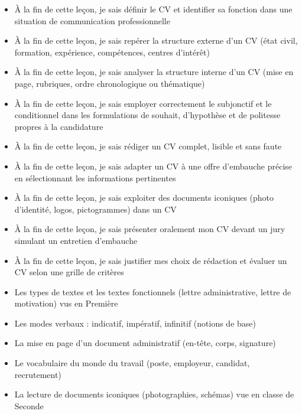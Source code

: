 \documentclass[11pt]{article}
\begin{document}
\begin{objectifs}
\begin{itemize}
\item À la fin de cette leçon, je sais définir le CV et identifier sa fonction dans une situation de communication professionnelle
\item À la fin de cette leçon, je sais repérer la structure externe d'un CV (état civil, formation, expérience, compétences, centres d'intérêt)
\item À la fin de cette leçon, je sais analyser la structure interne d'un CV (mise en page, rubriques, ordre chronologique ou thématique)
\item À la fin de cette leçon, je sais employer correctement le subjonctif et le conditionnel dans les formulations de souhait, d'hypothèse et de politesse propres à la candidature
\item À la fin de cette leçon, je sais rédiger un CV complet, lisible et sans faute
\item À la fin de cette leçon, je sais adapter un CV à une offre d'embauche précise en sélectionnant les informations pertinentes
\item À la fin de cette leçon, je sais exploiter des documents iconiques (photo d'identité, logos, pictogrammes) dans un CV
\item À la fin de cette leçon, je sais présenter oralement mon CV devant un jury simulant un entretien d'embauche
\item À la fin de cette leçon, je sais justifier mes choix de rédaction et évaluer un CV selon une grille de critères
\end{itemize}
\end{objectifs}

\begin{prerequis}
\begin{itemize}
\item Les types de textes et les textes fonctionnels (lettre administrative, lettre de motivation) vus en Première
\item Les modes verbaux : indicatif, impératif, infinitif (notions de base)
\item La mise en page d'un document administratif (en-tête, corps, signature)
\item Le vocabulaire du monde du travail (poste, employeur, candidat, recrutement)
\item La lecture de documents iconiques (photographies, schémas) vue en classe de Seconde
\end{itemize}
\end{prerequis}
\end{document}
